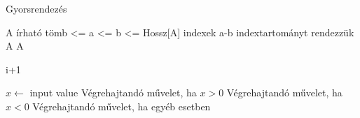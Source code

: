 \documentclass{article}
\theoremstyle{plain}
\theoremstyle{definition}
\theoremstyle{remark}
\begin{document}
\begin{algorithm}
\caption{Gyorsrendezés}
\label{gyorsrendezes}
\begin{algorithmic}[2]
\Require A írható tömb
 <= a <= b <= Hossz[A] indexek
\Ensure a-b indextartományt rendezzük
\Return A
\Else
{}
\Return A
\EndIf
\EndProcedure
\end{algorithmic}
\end{algorithm}
\begin{algorithmic}
\DoWhile
\State i+1
\end{algorithmic}
\begin{algorithmic}
\State $x \gets$ input value
\Cases
{}
\State Végrehajtandó művelet, ha $x > 0$
\State Végrehajtandó művelet, ha $x < 0$
\Otherwise
\State Végrehajtandó művelet, ha egyéb esetben
\EndCases
\end{algorithmic}
\end{document}
